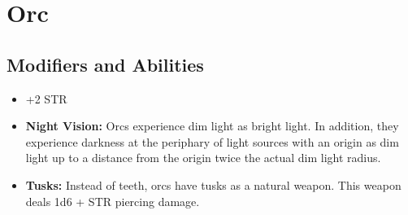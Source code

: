 \section{Orc}\label{orc}

\subsection*{Modifiers and Abilities}
\begin{itemize}
    \item +2 STR
    \item \textbf{Night Vision:} Orcs experience dim light as bright light. In
        addition, they experience darkness at the periphary of light sources
        with an origin as dim light up to a distance from the origin twice the
        actual dim light radius.
    \item \textbf{Tusks:} Instead of teeth, orcs have tusks as a natural
        weapon. This weapon deals 1d6 + STR piercing damage.
\end{itemize}

